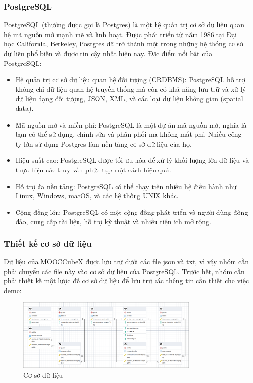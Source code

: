 \subsubsection{PostgreSQL}

PostgreSQL (thường được gọi là Postgres) là một hệ quản trị cơ sở dữ liệu quan
hệ mã nguồn mở mạnh mẽ và linh hoạt. Được phát triển từ năm 1986 tại Đại học
California, Berkeley, Postgres đã trở thành một trong những hệ thống cơ sở dữ
liệu phổ biến và được tin cậy nhất hiện nay. Đặc điểm nổi bật của PostgreSQL:
\begin{itemize}
    \item Hệ quản trị cơ sở dữ liệu quan hệ đối tượng (ORDBMS): PostgreSQL hỗ
        trợ không chỉ dữ liệu quan hệ truyền thống mà còn có khả năng lưu trữ và xử lý dữ liệu dạng đối tượng, JSON, XML, và các loại dữ liệu không gian (spatial data).

    \item Mã nguồn mở và miễn phí: PostgreSQL là một dự án mã nguồn mở, nghĩa
        là bạn có thể sử dụng, chỉnh sửa và phân phối mà không mất phí. Nhiều công ty lớn sử dụng Postgres làm nền tảng cơ sở dữ liệu của họ.

    \item Hiệu suất cao: PostgreSQL được tối ưu hóa để xử lý khối lượng lớn dữ
        liệu và thực hiện các truy vấn phức tạp một cách hiệu quả.

    \item Hỗ trợ đa nền tảng: PostgreSQL có thể chạy trên nhiều hệ điều hành
        như Linux, Windows, macOS, và các hệ thống UNIX khác.

    \item Cộng đồng lớn: PostgreSQL có một cộng đồng phát triển và người dùng
        đông đảo, cung cấp tài liệu, hỗ trợ kỹ thuật và nhiều tiện ích mở rộng.
\end{itemize}

\subsubsection{Thiết kế cơ sở dữ liệu}

Dữ liệu của MOOCCubeX được lưu trữ dưới các file json và txt, vì vậy nhóm cần
phải chuyển các file này vào cơ sở dữ liệu của PostgreSQL. Trước hết, nhóm cần phải
thiết kế một lược đồ cơ sở dữ liệu để lưu trữ các thông tin cần thiết cho việc demo:

\begin{figure}[H]
    \centering
    \includegraphics[width=0.8\textwidth]{figures/72.png}
    \caption{Cơ sở dữ liệu}
\end{figure}

